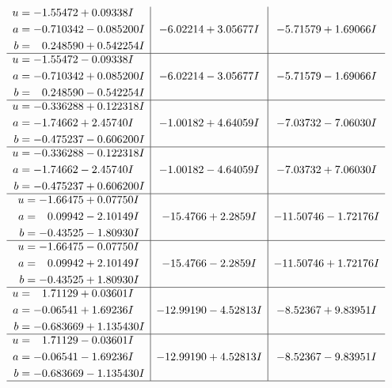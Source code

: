 \documentclass[1p]{elsarticle_modified}
\theoremstyle{definition}
\begin{document}
$$\begin{array}{c|c|c}
\begin{aligned}
u &= -1.55472 + 0.09338 I \\
a &= -0.710342 - 0.085200 I \\
b &= \phantom{-}0.248590 + 0.542254 I\end{aligned}
 & -6.02214 + 3.05677 I & -5.71579 + 1.69066 I \\ \hline\begin{aligned}
u &= -1.55472 - 0.09338 I \\
a &= -0.710342 + 0.085200 I \\
b &= \phantom{-}0.248590 - 0.542254 I\end{aligned}
 & -6.02214 - 3.05677 I & -5.71579 - 1.69066 I \\ \hline\begin{aligned}
u &= -0.336288 + 0.122318 I \\
a &= -1.74662 + 2.45740 I \\
b &= -0.475237 - 0.606200 I\end{aligned}
 & -1.00182 + 4.64059 I & -7.03732 - 7.06030 I \\ \hline\begin{aligned}
u &= -0.336288 - 0.122318 I \\
a &= -1.74662 - 2.45740 I \\
b &= -0.475237 + 0.606200 I\end{aligned}
 & -1.00182 - 4.64059 I & -7.03732 + 7.06030 I \\ \hline\begin{aligned}
u &= -1.66475 + 0.07750 I \\
a &= \phantom{-}0.09942 - 2.10149 I \\
b &= -0.43525 - 1.80930 I\end{aligned}
 & -15.4766 + 2.2859 I & -11.50746 - 1.72176 I \\ \hline\begin{aligned}
u &= -1.66475 - 0.07750 I \\
a &= \phantom{-}0.09942 + 2.10149 I \\
b &= -0.43525 + 1.80930 I\end{aligned}
 & -15.4766 - 2.2859 I & -11.50746 + 1.72176 I \\ \hline\begin{aligned}
u &= \phantom{-}1.71129 + 0.03601 I \\
a &= -0.06541 + 1.69236 I \\
b &= -0.683669 + 1.135430 I\end{aligned}
 & -12.99190 - 4.52813 I & -8.52367 + 9.83951 I \\ \hline\begin{aligned}
u &= \phantom{-}1.71129 - 0.03601 I \\
a &= -0.06541 - 1.69236 I \\
b &= -0.683669 - 1.135430 I\end{aligned}
 & -12.99190 + 4.52813 I & -8.52367 - 9.83951 I\\
 \hline 
 \end{array}$$\newpage\newpage\renewcommand{\arraystretch}{1}
\end{document}
